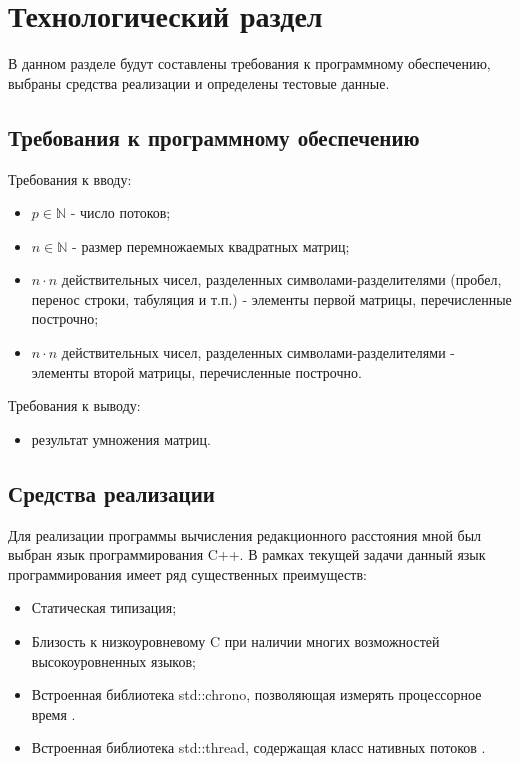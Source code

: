 \chapter{Технологический раздел}
\label{cha:impl}

В данном разделе будут составлены требования к программному обеспечению, выбраны средства реализации и определены тестовые данные.

\section{Требования к программному обеспечению}
Требования к вводу:
\begin{itemize}
    \item $p \in \mathbb{N}$ - число потоков;
    \item $n \in \mathbb{N}$ - размер перемножаемых квадратных матриц;
    \item $n \cdot{} n$ действительных чисел, разделенных символами-разделителями (пробел, перенос строки, табуляция и т.п.) - элементы первой матрицы, перечисленные построчно;
    \item $n \cdot{} n$ действительных чисел, разделенных символами-разделителями - элементы второй матрицы, перечисленные построчно.
\end{itemize}
Требования к выводу:
\begin{itemize}
    \item результат умножения матриц.
\end{itemize}

\section{Средства реализации}
Для реализации программы вычисления редакционного расстояния мной был выбран язык программирования C++. В рамках текущей задачи данный язык программирования имеет ряд существенных преимуществ:
\begin{itemize}
    \item Статическая типизация;
    \item Близость к низкоуровневому C при наличии многих возможностей высокоуровненных языков;
    \item Встроенная библиотека std::chrono, позволяющая измерять процессорное время \cite{chrono}.
    \item Встроенная библиотека std::thread, содержащая класс нативных потоков \cite{thread}.
\end{itemize}

